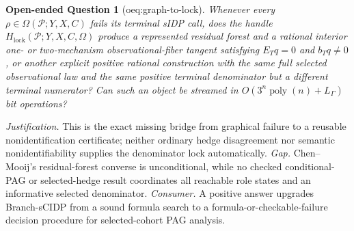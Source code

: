 \documentclass{article}
\newtheorem{openendedquestion}{Open-ended Question}
\begin{document}
\begin{openendedquestion}[oeq:graph-to-lock]\label{oeq:graph-to-lock}
Whenever every \(\rho\in\Omega(\mathcal P;Y,X,C)\) fails its terminal sIDP call, does the handle \(H_{\mathrm{lock}}(\mathcal P;Y,X,C,\Omega)\) produce a represented residual forest and a rational interior one- or two-mechanism observational-fiber tangent satisfying \(E_Tq=0\) and \(b_Tq\neq0\), or another explicit positive rational construction with the same full selected observational law and the same positive terminal denominator but a different terminal numerator? Can such an object be streamed in \(O(3^n\operatorname{poly}(n)+L_{\Gamma})\) bit operations?
\end{openendedquestion}
\par\smallskip\noindent \textit{Justification.} This is the exact missing bridge from graphical failure to a reusable nonidentification certificate; neither ordinary hedge disagreement nor semantic nonidentifiability supplies the denominator lock automatically. \textit{Gap.} Chen--Mooij's residual-forest converse is unconditional, while no checked conditional-PAG or selected-hedge result coordinates all reachable role states and an informative selected denominator. \textit{Consumer.} A positive answer upgrades Branch-sCIDP from a sound formula search to a formula-or-checkable-failure decision procedure for selected-cohort PAG analysis.
\end{document}
